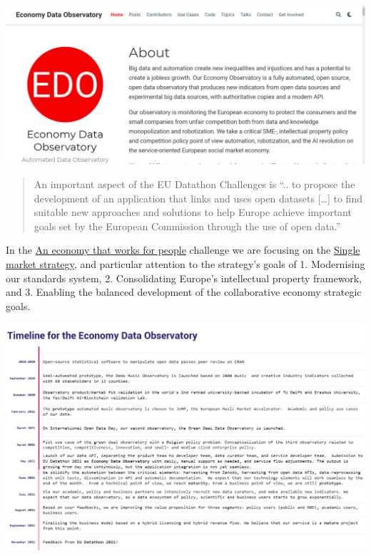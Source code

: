 \documentclass[
  a4paper,
  openany, a4paper, oneside]{book}
\begin{document}
\begin{center}\includegraphics[width=26.67in]{plots/screenshots/edo_opening_page} \end{center}

\begin{quote}
An important aspect of the EU Datathon Challenges is ``.. to propose the development of an application that links and uses open datasets {[}\ldots{]} to find suitable new approaches and solutions to help Europe achieve important goals set by the European Commission through the use of open data.''
\end{quote}

In the \href{https://ec.europa.eu/info/strategy/priorities-2019-2024/economy-works-people_en\#:~:text=Individuals\%20and\%20businesses\%20in\%20the,needs\%20of\%20the\%20EU's\%20citizens.}{An economy that works for people} challenge we are focusing on the \href{https://ec.europa.eu/info/strategy/priorities-2019-2024/economy-works-people/internal-market_en}{Single market strategy}, and particular attention to the strategy's goals of 1. Modernising our standards system, 2. Consolidating Europe's intellectual property framework, and 3. Enabling the balanced development of the collaborative economy strategic goals.

\begin{center}\includegraphics[width=24.72in]{plots/screenshots/Economy_Data_Observatory_timeline} \end{center}
\end{document}
